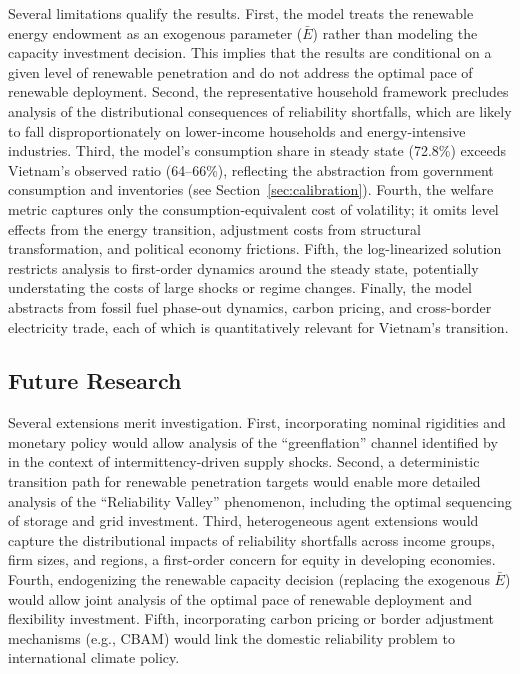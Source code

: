 \documentclass[12pt, a4paper]{article}
\begin{document}
	Several limitations qualify the results. First, the model treats the renewable energy endowment as an exogenous parameter ($\bar{E}$) rather than modeling the capacity investment decision. This implies that the results are conditional on a given level of renewable penetration and do not address the optimal pace of renewable deployment. Second, the representative household framework precludes analysis of the distributional consequences of reliability shortfalls, which are likely to fall disproportionately on lower-income households and energy-intensive industries. Third, the model's consumption share in steady state (72.8\%) exceeds Vietnam's observed ratio (64--66\%), reflecting the abstraction from government consumption and inventories (see Section~\ref{sec:calibration}). Fourth, the welfare metric captures only the consumption-equivalent cost of volatility; it omits level effects from the energy transition, adjustment costs from structural transformation, and political economy frictions. Fifth, the log-linearized solution restricts analysis to first-order dynamics around the steady state, potentially understating the costs of large shocks or regime changes. Finally, the model abstracts from fossil fuel phase-out dynamics, carbon pricing, and cross-border electricity trade, each of which is quantitatively relevant for Vietnam's transition.

	\subsection*{Future Research}

	Several extensions merit investigation. First, incorporating nominal rigidities and monetary policy would allow analysis of the ``greenflation'' channel identified by \citet{airaudo2025green} in the context of intermittency-driven supply shocks. Second, a deterministic transition path for renewable penetration targets would enable more detailed analysis of the ``Reliability Valley'' phenomenon, including the optimal sequencing of storage and grid investment. Third, heterogeneous agent extensions would capture the distributional impacts of reliability shortfalls across income groups, firm sizes, and regions, a first-order concern for equity in developing economies. Fourth, endogenizing the renewable capacity decision (replacing the exogenous $\bar{E}$) would allow joint analysis of the optimal pace of renewable deployment and flexibility investment. Fifth, incorporating carbon pricing or border adjustment mechanisms (e.g., CBAM) would link the domestic reliability problem to international climate policy.
\end{document}
